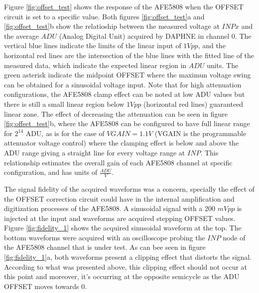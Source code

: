 Figure \ref{fig:offset_test} shows the response of the AFE5808 when the OFFSET circuit is set to a specific value. Both figures \ref{fig:offset_test}a and \ref{fig:offset_test}b show the relatioship between the measured voltage at $INPx$ and the average $ADU$ (Analog Digital Unit) acquired by DAPHNE in channel 0. The vertical blue lines indicate the limits of the linear input of $1Vpp$, and the horizontal red lines are the intersection of the blue lines with the fitted line of the measured data, which indicate the expected linear region in $ADU$ units. The green asterisk indicate the midpoint OFFSET where the maximun voltage swing can be obtained for a sinusoidal voltage input. Note that for high attenuation configurations, the AFE5808 clamp effect can be noted at low ADU values but there is still a small linear region below $1Vpp$ (horizontal red lines) guaranteed linear zone. The effect of decreasing the attenuation can be seen in figure \ref{fig:offset_test}b, where the AFE5808 can be configured to have full linear range for $2^{14}$ ADU, as is for the case of $VGAIN = 1.1V$ (VGAIN is the programmable attenuator voltage control) where the clamping effect is below and above the ADU range giving a straight line for every voltage range at $INP$. This relationship estimates the overall gain of each AFE5808 channel at specific configuration, and has units of $\frac{ADU}{V}$. 

The signal fidelity of the acquired waveforms was a concern, specially the effect of the OFFSET correction circuit could have in the internal amplification and digitization processes of the AFE5808. A sinusoidal signal with a 200 $mVpp$ is injected at the input and waveforms are acquired stepping OFFSET values. Figure \ref{fig:fidelity_1} shows the acquired sinusoidal waveform at the top. The bottom waveforms were acquired with an oscilloscope probing the $INP$ node of the AFE5808 channel that is under test. As can bee seen in figure \ref{fig:fidelity_1}a, both waveforms present a clipping effect that distorts the signal. According to what was presented above, this clipping effect should not occur at this point and moreover, it's occurring at the opposite semicycle as the ADU OFFSET moves towards 0. 

